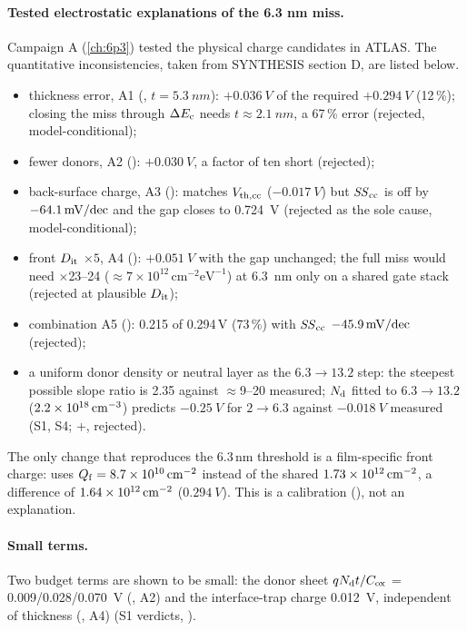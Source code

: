 \paragraph{Tested electrostatic explanations of the 6.3 nm miss.} Campaign A (\cref{ch:6p3}) tested the physical charge candidates in ATLAS. The quantitative inconsistencies, taken from SYNTHESIS section D, are listed below.
\begin{itemize}
\item thickness error, A1 (, $t = \SI{5.3}{nm}$): $+\SI{0.036}{V}$ of the required $+\SI{0.294}{V}$ (12\,\%); closing the miss through $\Delta E_{\mathrm{c}}$ needs $t \approx \SI{2.1}{nm}$, a 67\,\% error (rejected, model-conditional);
\item fewer donors, A2 (): $+\SI{0.030}{V}$, a factor of ten short (rejected);
\item back-surface charge, A3 (): matches $V_{\mathrm{th,cc}}$ ($-\SI{0.017}{V}$) but $\mathit{SS}_{\mathrm{cc}}$ is off by $-64.1\,\mathrm{mV/dec}$ and the gap closes to \SI{0.724}{V} (rejected as the sole cause, model-conditional);
\item front $D_{\mathrm{it}}$ $\times 5$, A4 (): $+\SI{0.051}{V}$ with the gap unchanged; the full miss would need $\times$23--24 ($\approx 7\times10^{12}\,\mathrm{cm^{-2}eV^{-1}}$) at \SI{6.3}{nm} only on a shared gate stack (rejected at plausible $D_{\mathrm{it}}$);
\item combination A5 (): 0.215 of 0.294\,V (73\,\%) with $\mathit{SS}_{\mathrm{cc}}$ $-45.9\,\mathrm{mV/dec}$ (rejected);
\item a uniform donor density or neutral layer as the $6.3 \rightarrow 13.2$ step: the steepest possible slope ratio is 2.35 against $\approx$9--20 measured; $N_{\mathrm{d}}$ fitted to $6.3\rightarrow13.2$ ($2.2\times10^{18}\,\mathrm{cm}^{-3}$) predicts $-\SI{0.25}{V}$ for $2\rightarrow6.3$ against $-\SI{0.018}{V}$ measured (S1, S4; \evSURR{}+\evDATA, rejected).
\end{itemize}
The only change that reproduces the 6.3\,nm threshold is a film-specific front charge:  uses $Q_{\mathrm{f}} = 8.7\times10^{10}\,\mathrm{cm}^{-2}$ instead of the shared $1.73\times10^{12}\,\mathrm{cm}^{-2}$, a difference of $1.64\times10^{12}\,\mathrm{cm}^{-2}$ ($\SI{0.294}{V}$). This is a calibration (\evCAL), not an explanation.

\paragraph{Small terms.} Two budget terms are shown to be small: the donor sheet $qN_{\mathrm{d}} t/C_{\mathrm{ox}}$ = 0.009/0.028/\SI{0.070}{V} (, A2) and the interface-trap charge \SI{0.012}{V}, independent of thickness (, A4) (S1 verdicts, \evNUM).

